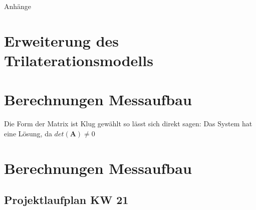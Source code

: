 %
%
%
%

\begin{appendix}
\newpage
\begin{center}
	\huge{Anhänge}
\end{center}

\normalsize

\section{Erweiterung des Trilaterationsmodells}
\label{sec:extended_trilateration_model}


\newpage
	\section{Berechnungen Messaufbau}
%
Die Form der Matrix ist Klug gewählt so lässt sich direkt sagen: Das System hat eine Lösung, da $det(\mathbf{A})\neq 0$
	
	\label{sec:coordinate_Measurements}
\newpage
	\section{Berechnungen Messaufbau}
%
	
	\label{sec:coordinate_Measurements_Numerical}
\newpage
\begin{landscape}
	\section{Projektlaufplan KW 21}
	\label{sec:projectplan}
	\scalebox{.75}{
		
		}
\end{landscape}


\end{appendix}

